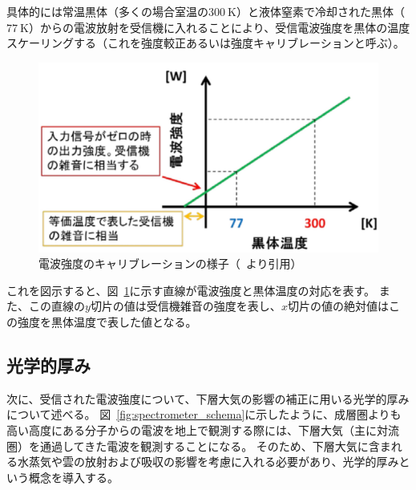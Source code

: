 具体的には常温黒体（多くの場合室温の$300\ \mathrm{K}$）と液体窒素で冷却された黒体（$77\ \mathrm{K}$）からの電波放射を受信機に入れることにより、受信電波強度を黒体の温度スケーリングする（これを強度較正あるいは強度キャリブレーションと呼ぶ）。
\begin{figure}[htbp]
    \centering
    \includegraphics[scale=0.6]{master_thesis_contents/master_thesis_fig/calibration.pdf}
    \caption{電波強度のキャリブレーションの様子（~\cite{ito2017master}より引用）}
    \label{fig:calibration}
\end{figure}
これを図示すると、図~\ref{fig:calibration}に示す直線が電波強度と黒体温度の対応を表す。
また、この直線の$y$切片の値は受信機雑音の強度を表し、$x$切片の値の絶対値はこの強度を黒体温度で表した値となる。


\subsection{光学的厚み}
\label{ssec:obs_opticaldepth}
次に、受信された電波強度について、下層大気の影響の補正に用いる光学的厚みについて述べる。
図~\ref{fig:spectrometer_schema}に示したように、成層圏よりも高い高度にある分子からの電波を地上で観測する際には、下層大気（主に対流圏）を通過してきた電波を観測することになる。
そのため、下層大気に含まれる水蒸気や雲の放射および吸収の影響を考慮に入れる必要があり、光学的厚みという概念を導入する。\par

